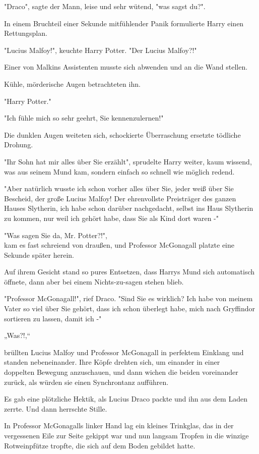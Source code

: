 {"Draco", sagte der Mann, leise und sehr wütend, "was sagst du?".

In einem Bruchteil einer Sekunde mitfühlender Panik formulierte Harry einen Rettungsplan.

"Lucius Malfoy!", keuchte Harry Potter. "Der Lucius Malfoy?!"

Einer von Malkins Assistenten musste sich abwenden und an die Wand stellen.

Kühle, mörderische Augen betrachteten ihn.

"Harry Potter."

"Ich fühle mich so sehr geehrt, Sie kennenzulernen!"

Die dunklen Augen weiteten sich, schockierte Überraschung ersetzte tödliche Drohung.

"Ihr Sohn hat mir alles über Sie erzählt", sprudelte Harry weiter, kaum wissend, was aus seinem Mund kam, sondern einfach so schnell wie möglich redend.

"Aber natürlich wusste ich schon vorher alles über Sie, jeder weiß über Sie Bescheid, der große Lucius Malfoy! Der ehrenvollste Preisträger des ganzen Hauses Slytherin, ich habe schon darüber nachgedacht, selbst ins Haus Slytherin zu kommen, nur weil ich gehört habe, dass Sie als Kind dort waren -"

"Was sagen Sie da, Mr. Potter?!",\\ kam es fast schreiend von draußen, und Professor McGonagall platzte eine Sekunde später herein.

Auf ihrem Gesicht stand so pures Entsetzen, dass Harrys Mund sich automatisch öffnete, dann aber bei einem Nichts-zu-sagen stehen blieb.

"Professor McGonagall!", rief Draco. "Sind Sie es wirklich? Ich habe von meinem Vater so viel über Sie gehört, dass ich schon überlegt habe, mich nach Gryffindor sortieren zu lassen, damit ich -"

„Was?!,“

brüllten Lucius Malfoy und Professor McGonagall in perfektem Einklang und standen nebeneinander. Ihre Köpfe drehten sich, um einander in einer\\ doppelten Bewegung anzuschauen, und dann wichen die beiden voreinander zurück, als würden sie einen Synchrontanz aufführen.

Es gab eine plötzliche Hektik, als Lucius Draco packte und ihn aus dem Laden zerrte. Und dann herrschte Stille.

In Professor McGonagalls linker Hand lag ein kleines Trinkglas, das in der vergessenen Eile zur Seite gekippt war und nun langsam Tropfen in die winzige Rotweinpfütze tropfte, die sich auf dem Boden gebildet hatte.

}
